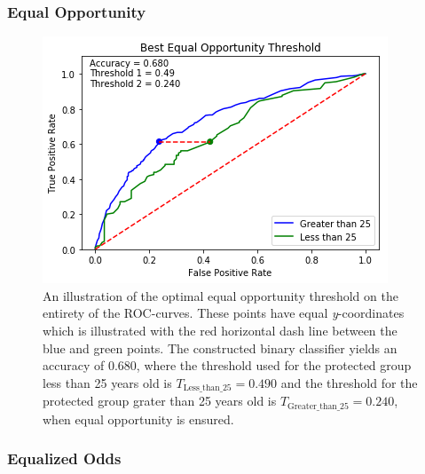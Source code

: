 \documentclass[11pt, fleqn, titlepage]{article}
\begin{document}
	\subsubsection{Equal Opportunity}
	
	\begin{figure}[H]
		\centering
		\includegraphics[width=0.5\linewidth]{"imgs/Equal Opportunity Optimal_age"}
		\caption{An illustration of the optimal equal opportunity threshold on the entirety of the ROC-curves. These points have equal \textit{y}-coordinates which is illustrated with the red horizontal dash line between the blue and green points. The constructed binary classifier yields an accuracy of $ 0.680 $, where the threshold used for the protected group less than 25 years old is $T_{\text{Less\_than\_25}}= 0.490 $ and the threshold for the protected group grater than 25 years old is $ T_{\text{Greater\_than\_25}}=0.240 $, when equal opportunity is ensured.}
		\label{fig:equal-opportunity-optimalage}
	\end{figure}
	
	\subsubsection{Equalized Odds}
	
\end{document}
